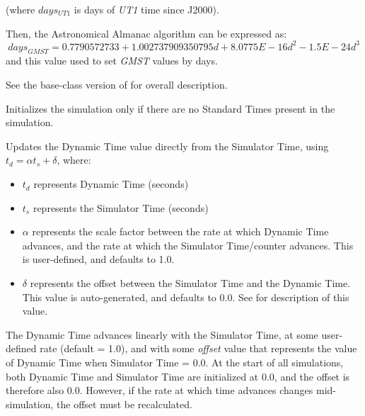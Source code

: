 {\begin{enumerate}
{\begin{enumerate}
(where  $days_{UT1}$ is days of \textit{UT1} time since
J2000).

Then, the Astronomical Almanac algorithm can be expressed as:
\begin{equation}
\mathit{days}_{\mathit{GMST}}=0.7790572733+1.002737909350795d+8.0775E-16d^{2}-1.5E-24d^{3}
\end{equation}
and this value used to set \textit{GMST} values by days.

See the base-class version of 
 for overall description.


\end{enumerate}}

\label{ref:TimeDyn}


{\begin{enumerate}
Initializes the simulation only if there are no Standard Times present
in the simulation.

Updates the Dynamic Time value directly from the Simulator Time, using
$t_{d}=\alpha t_{s}+\delta $, where:


\begin{itemize}
\item  $t_{d}$ represents Dynamic Time (seconds)
\item  $t_{s}$ represents the Simulator Time (seconds)
\item  $\alpha $ represents the scale factor between the rate at which
Dynamic Time advances, and the rate at which the Simulator Time/counter
advances.  This is user-defined, and defaults to 1.0.
\item  $\delta $ represents the offset between the Simulator Time and
the Dynamic Time.  This value is auto-generated, and defaults to 0.0. 
See  for description of this value.
\end{itemize}

\label{ref:updateoffset}
The Dynamic Time advances linearly with the
Simulator Time, at some user-defined rate (default = 1.0), and with
some \textit{offset} value that represents the value of Dynamic Time
when Simulator Time = 0.0.  At the start of all simulations, both
Dynamic Time and Simulator Time are initialized at 0.0, and the offset
is therefore also 0.0.  However, if the rate at which time advances
changes mid-simulation, the offset must be recalculated.


\end{enumerate}}
\end{enumerate}}
